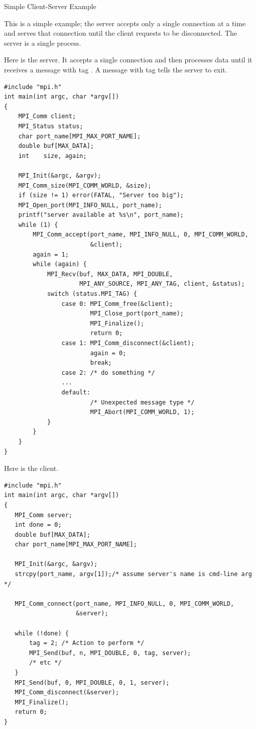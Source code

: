\begin{example}
%
Simple Client-Server Example

\noindent
This is a simple example; the server
accepts only a single connection at a time and serves that connection until
the client requests to be disconnected.  The server is a single
process.

Here is the server.  It accepts a single connection and then processes data
until it receives a message with tag .  A message with tag 
tells the server to exit.
\begin{lstlisting}[language={[MPI]C}]
#include "mpi.h"
int main(int argc, char *argv[])
{
    MPI_Comm client;
    MPI_Status status;
    char port_name[MPI_MAX_PORT_NAME];
    double buf[MAX_DATA];
    int    size, again;

    MPI_Init(&argc, &argv);
    MPI_Comm_size(MPI_COMM_WORLD, &size);
    if (size != 1) error(FATAL, "Server too big");
    MPI_Open_port(MPI_INFO_NULL, port_name);
    printf("server available at %s\n", port_name);
    while (1) {
        MPI_Comm_accept(port_name, MPI_INFO_NULL, 0, MPI_COMM_WORLD,
                        &client);
        again = 1;
        while (again) {
            MPI_Recv(buf, MAX_DATA, MPI_DOUBLE,
                     MPI_ANY_SOURCE, MPI_ANY_TAG, client, &status);
            switch (status.MPI_TAG) {
                case 0: MPI_Comm_free(&client);
                        MPI_Close_port(port_name);
                        MPI_Finalize();
                        return 0;
                case 1: MPI_Comm_disconnect(&client);
                        again = 0;
                        break;
                case 2: /* do something */
                ...
                default:
                        /* Unexpected message type */
                        MPI_Abort(MPI_COMM_WORLD, 1);
            }
        }
    }
}
\end{lstlisting}

\noindent
Here is the client.

\begin{lstlisting}[language={[MPI]C}]
#include "mpi.h"
int main(int argc, char *argv[])
{
   MPI_Comm server;
   int done = 0;
   double buf[MAX_DATA];
   char port_name[MPI_MAX_PORT_NAME];

   MPI_Init(&argc, &argv);
   strcpy(port_name, argv[1]);/* assume server's name is cmd-line arg */

   MPI_Comm_connect(port_name, MPI_INFO_NULL, 0, MPI_COMM_WORLD,
                    &server);

   while (!done) {
       tag = 2; /* Action to perform */
       MPI_Send(buf, n, MPI_DOUBLE, 0, tag, server);
       /* etc */
   }
   MPI_Send(buf, 0, MPI_DOUBLE, 0, 1, server);
   MPI_Comm_disconnect(&server);
   MPI_Finalize();
   return 0;
}
\end{lstlisting}
\end{example}


